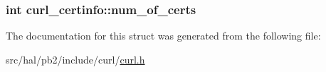 \subsubsection[{\texorpdfstring{num\+\_\+of\+\_\+certs}{num_of_certs}}]{\setlength{\rightskip}{0pt plus 5cm}int curl\+\_\+certinfo\+::num\+\_\+of\+\_\+certs}\hypertarget{structcurl__certinfo_a9eb8ef837e5a8ddb848ac7bae35ed92f}{}\label{structcurl__certinfo_a9eb8ef837e5a8ddb848ac7bae35ed92f}


The documentation for this struct was generated from the following file\+:\begin{DoxyCompactItemize}
\item 
src/hal/pb2/include/curl/\hyperlink{curl_8h}{curl.\+h}\end{DoxyCompactItemize}
